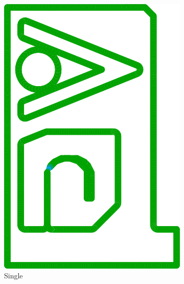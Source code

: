 \begin{figure}
\begin{subfigure}{\figwidth}
\includegraphics[height=\figheight]{sources/validation/gMAT_example/TEST_SingleBead_widths.png}
\caption{Single}\label{TEST_SingleBead_accuracy}
\end{subfigure}
\begin{subfigure}{\figwidth}\centering

\end{subfigure}
\end{figure}
